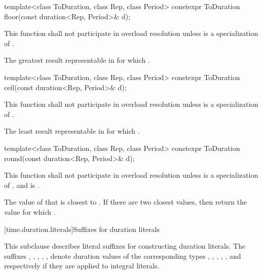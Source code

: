 %
\begin{itemdecl}
template<class ToDuration, class Rep, class Period>
  constexpr ToDuration floor(const duration<Rep, Period>& d);
\end{itemdecl}

\begin{itemdescr}
\pnum
\remarks
This function shall not participate in overload resolution
unless  is a specialization of .

\pnum
\returns
The greatest result  representable in 
for which .
\end{itemdescr}

%
\begin{itemdecl}
template<class ToDuration, class Rep, class Period>
  constexpr ToDuration ceil(const duration<Rep, Period>& d);
\end{itemdecl}

\begin{itemdescr}
\pnum
\remarks
This function shall not participate in overload resolution
unless  is a specialization of .

\pnum
\returns
The least result  representable in 
for which .
\end{itemdescr}

%
\begin{itemdecl}
template<class ToDuration, class Rep, class Period>
  constexpr ToDuration round(const duration<Rep, Period>& d);
\end{itemdecl}

\begin{itemdescr}
\pnum
\remarks
This function shall not participate in overload resolution
unless  is a specialization of ,
and 
is .

\pnum
\returns
The value of  that is closest to .
If there are two closest values, then return the value 
for which .
\end{itemdescr}

[time.duration.literals]{Suffixes for duration literals}

\pnum
This subclause describes literal suffixes for constructing duration literals. The
suffixes , , , , , 
denote duration values of the corresponding types , ,
, , , and 
respectively if they are applied to integral literals.

